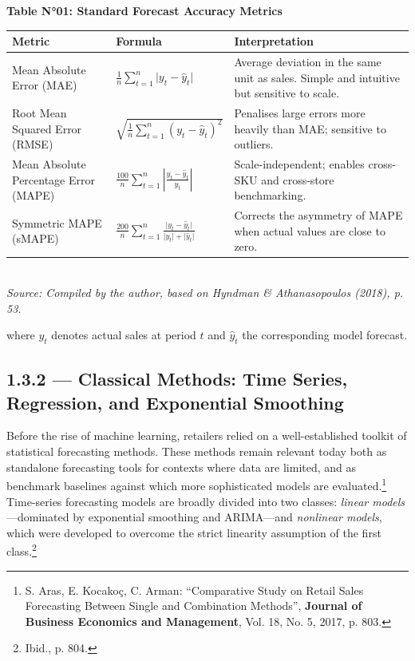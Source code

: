 \begin{table}[h!]
\centering
{\bfseries Table N°01: Standard Forecast Accuracy Metrics}\\[6pt]
\renewcommand{\arraystretch}{1.8}
\begin{tabular}{p{3.6cm} p{5.2cm} p{5.5cm}}
\toprule
\textbf{Metric} & \textbf{Formula} & \textbf{Interpretation} \\
\midrule
Mean Absolute Error (MAE)
  & $\displaystyle\frac{1}{n}\sum_{t=1}^{n}\lvert y_t - \hat{y}_t\rvert$
  & Average deviation in the same unit as sales. Simple and
    intuitive but sensitive to scale. \\[6pt]
Root Mean Squared Error (RMSE)
  & $\displaystyle\sqrt{\frac{1}{n}\sum_{t=1}^{n}(y_t-\hat{y}_t)^{2}}$
  & Penalises large errors more heavily than MAE; sensitive to
    outliers. \\[6pt]
Mean Absolute Percentage Error (MAPE)
  & $\displaystyle\frac{100}{n}\sum_{t=1}^{n}
    \left\lvert\frac{y_t-\hat{y}_t}{y_t}\right\rvert$
  & Scale-independent; enables cross-SKU and cross-store
    benchmarking. \\[6pt]
Symmetric MAPE (sMAPE)
  & $\displaystyle\frac{200}{n}\sum_{t=1}^{n}
    \frac{\lvert y_t-\hat{y}_t\rvert}{\lvert y_t\rvert+\lvert\hat{y}_t\rvert}$
  & Corrects the asymmetry of MAPE when actual values are close
    to zero. \\
\bottomrule
\end{tabular}\\[5pt]
{\small\textit{Source: Compiled by the author, based on Hyndman \&
Athanasopoulos (2018), p. 53.}}
\label{tab:01}
\end{table}

\noindent where $y_t$ denotes actual sales at period $t$ and $\hat{y}_t$
the corresponding model forecast.


\subsection{1.3.2 — Classical Methods: Time Series, Regression, and
Exponential Smoothing}
\label{subsec:1.3.2}

Before the rise of machine learning, retailers relied on a well-established
toolkit of statistical forecasting methods. These methods remain relevant
today both as standalone forecasting tools for contexts where data are
limited, and as benchmark baselines against which more sophisticated models
are evaluated.\footnote{S. Aras, E. Kocakoç, C. Arman: ``Comparative Study
on Retail Sales Forecasting Between Single and Combination Methods'',
\textbf{Journal of Business Economics and Management}, Vol. 18, No. 5,
2017, p. 803.} Time-series forecasting models are broadly divided into two
classes: \textit{linear models}—dominated by exponential smoothing and
ARIMA—and \textit{nonlinear models}, which were developed to overcome the
strict linearity assumption of the first class.\footnote{Ibid., p. 804.}

